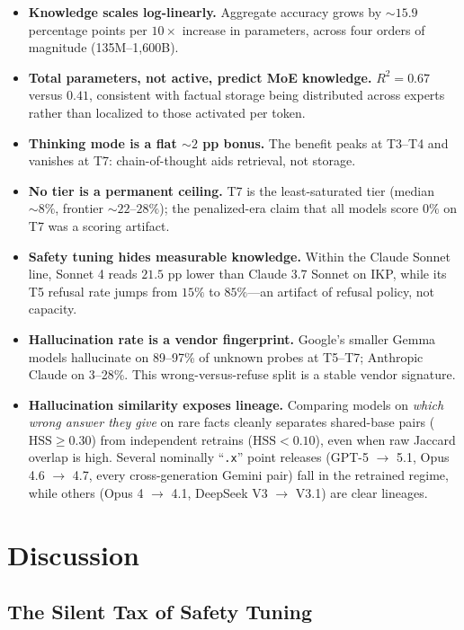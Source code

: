 \documentclass[11pt]{article}
\begin{document}
\begin{itemize}[leftmargin=*]
    \item \textbf{Knowledge scales log-linearly.} Aggregate accuracy grows by ${\sim}15.9$ percentage points per $10\times$ increase in parameters, across four orders of magnitude (135M--1{,}600B).
    \item \textbf{Total parameters, not active, predict MoE knowledge.} $R^2 = 0.67$ versus $0.41$, consistent with factual storage being distributed across experts rather than localized to those activated per token.
    \item \textbf{Thinking mode is a flat ${\sim}2$ pp bonus.} The benefit peaks at T3--T4 and vanishes at T7: chain-of-thought aids retrieval, not storage.
    \item \textbf{No tier is a permanent ceiling.} T7 is the least-saturated tier (median ${\sim}8\%$, frontier ${\sim}22$--$28\%$); the penalized-era claim that all models score $0\%$ on T7 was a scoring artifact.
    \item \textbf{Safety tuning hides measurable knowledge.} Within the Claude Sonnet line, Sonnet 4 reads $21.5$ pp lower than Claude 3.7 Sonnet on IKP, while its T5 refusal rate jumps from $15\%$ to $85\%$---an artifact of refusal policy, not capacity.
    \item \textbf{Hallucination rate is a vendor fingerprint.} Google's smaller Gemma models hallucinate on 89--97\% of unknown probes at T5--T7; Anthropic Claude on 3--28\%. This wrong-versus-refuse split is a stable vendor signature.
    \item \textbf{Hallucination similarity exposes lineage.} Comparing models on \emph{which wrong answer they give} on rare facts cleanly separates shared-base pairs ($\mathrm{HSS} \geq 0.30$) from independent retrains ($\mathrm{HSS} < 0.10$), even when raw Jaccard overlap is high. Several nominally ``\texttt{.x}'' point releases (GPT-5 $\to$ 5.1, Opus 4.6 $\to$ 4.7, every cross-generation Gemini pair) fall in the retrained regime, while others (Opus 4 $\to$ 4.1, DeepSeek V3 $\to$ V3.1) are clear lineages.
\end{itemize}

\section{Discussion}
\label{sec:discussion}

\subsection{The Silent Tax of Safety Tuning}
\label{sec:silent-tax}
\end{document}
